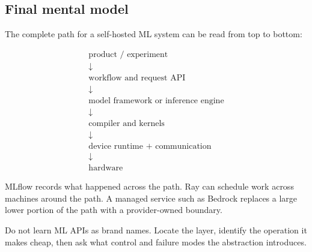 \subsection{Final mental model}

The complete path for a self-hosted ML system can be read from top to bottom:

\[
\boxed{
\begin{array}{c}
\text{product / experiment}\\
\downarrow\\
\text{workflow and request API}\\
\downarrow\\
\text{model framework or inference engine}\\
\downarrow\\
\text{compiler and kernels}\\
\downarrow\\
\text{device runtime + communication}\\
\downarrow\\
\text{hardware}
\end{array}
}
\]

MLflow records what happened across the path.
Ray can schedule work across machines around the path.
A managed service such as Bedrock replaces a large lower portion of the path with a provider-owned boundary.

\begin{calloutintuition}
Do not learn ML APIs as brand names.
Locate the layer, identify the operation it makes cheap, then ask what control and failure modes the abstraction introduces.
\end{calloutintuition}